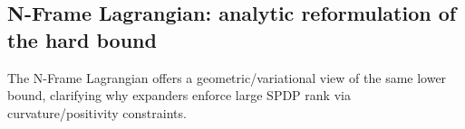 \documentclass[12pt]{article}
\theoremstyle{definition}
\theoremstyle{definition}
\theoremstyle{remark}
\theoremstyle{remark}
\begin{document}

\subsection{N-Frame Lagrangian: analytic reformulation of the hard bound}

The N-Frame Lagrangian offers a geometric/variational view of the same lower bound, clarifying why expanders enforce large SPDP rank via curvature/positivity constraints.
\end{document}

